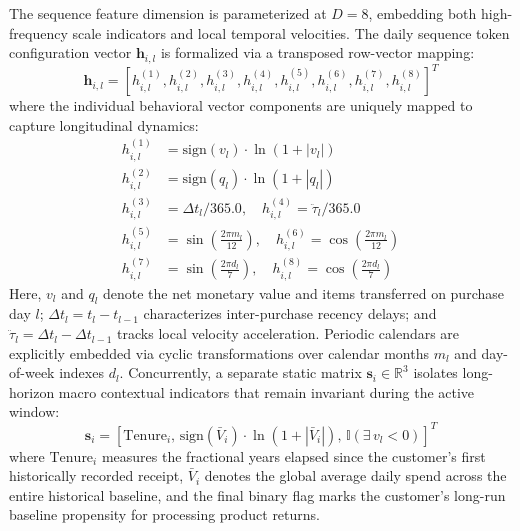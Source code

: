 \documentclass[10pt, conference]{IEEEtran}
\begin{document}
The sequence feature dimension is parameterized at $D=8$, embedding both high-frequency scale indicators and local temporal velocities. The daily sequence token configuration vector $\mathbf{h}_{i,l}$ is formalized via a transposed row-vector mapping:
\begin{equation}
\mathbf{h}_{i,l} = \left[ h_{i,l}^{(1)}, h_{i,l}^{(2)}, h_{i,l}^{(3)}, h_{i,l}^{(4)}, h_{i,l}^{(5)}, h_{i,l}^{(6)}, h_{i,l}^{(7)}, h_{i,l}^{(8)} \right]^T
\end{equation}
where the individual behavioral vector components are uniquely mapped to capture longitudinal dynamics:
\begin{subequations}
\begin{align}
h_{i,l}^{(1)} &= \text{sign}(v_l) \cdot \ln(1 + |v_l|) \\
h_{i,l}^{(2)} &= \text{sign}(q_l) \cdot \ln(1 + |q_l|) \\
h_{i,l}^{(3)} &= \Delta t_l / 365.0, \quad h_{i,l}^{(4)} = \ddot{\tau}_l / 365.0 \\
h_{i,l}^{(5)} &= \sin\left(\frac{2\pi m_l}{12}\right), \quad h_{i,l}^{(6)} = \cos\left(\frac{2\pi m_l}{12}\right) \\
h_{i,l}^{(7)} &= \sin\left(\frac{2\pi d_l}{7}\right), \quad h_{i,l}^{(8)} = \cos\left(\frac{2\pi d_l}{7}\right)
\end{align}
\end{subequations}
Here, $v_l$ and $q_l$ denote the net monetary value and items transferred on purchase day $l$; $\Delta t_l = t_l - t_{l-1}$ characterizes inter-purchase recency delays; and $\ddot{\tau}_l = \Delta t_l - \Delta t_{l-1}$ tracks local velocity acceleration. Periodic calendars are explicitly embedded via cyclic transformations over calendar months $m_l$ and day-of-week indexes $d_l$. Concurrently, a separate static matrix $\mathbf{s}_i \in \mathbb{R}^3$ isolates long-horizon macro contextual indicators that remain invariant during the active window:
\begin{equation}
\mathbf{s}_i = \left[ \text{Tenure}_i, \, \text{sign}(\bar{V}_i)\cdot\ln(1 + |\bar{V}_i|), \, \mathbb{I}(\exists \, v_l < 0) \right]^T
\end{equation}
where $\text{Tenure}_i$ measures the fractional years elapsed since the customer's first historically recorded receipt, $\bar{V}_i$ denotes the global average daily spend across the entire historical baseline, and the final binary flag marks the customer's long-run baseline propensity for processing product returns.
\end{document}
